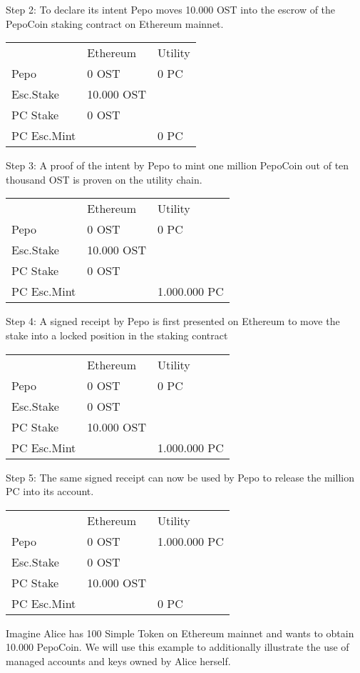 \documentclass[12pt,a4paper, twocolumn]{article}
\begin{document}
Step 2: To declare its intent Pepo moves 10.000 OST into the escrow of the PepoCoin staking contract on Ethereum mainnet. 
\begin{table}[H]
\centering
\label{Step-2}
\begin{tabular}{lll}
    & Ethereum    &   Utility   \\
Pepo        & 0 OST      & 0 PC \\
Esc.Stake   & 10.000 OST &      \\
PC Stake    & 0 OST      &      \\
PC Esc.Mint &            & 0 PC
\end{tabular}
\end{table}

Step 3: A proof of the intent by Pepo to mint one million PepoCoin out of ten thousand OST is proven on the utility chain.
\begin{table}[H]
\centering
\label{Step-3}
\begin{tabular}{lll}
    & Ethereum    &   Utility   \\
Pepo        & 0 OST      & 0 PC         \\
Esc.Stake   & 10.000 OST &              \\
PC Stake    & 0 OST      &              \\
PC Esc.Mint &            & 1.000.000 PC
\end{tabular}
\end{table} 

Step 4: A signed receipt by Pepo is first presented on Ethereum to move the stake into a locked position in the staking contract 
\begin{table}[H]
\centering
\label{Step-4}
\begin{tabular}{lll}
    & Ethereum    &   Utility   \\
Pepo        & 0 OST      & 0 PC         \\
Esc.Stake   & 0 OST      &              \\
PC Stake    & 10.000 OST &              \\
PC Esc.Mint &            & 1.000.000 PC
\end{tabular}
\end{table} 

Step 5: The same signed receipt can now be used by Pepo to release the million PC into its account.
\begin{table}[H]
\centering
\label{Step-5}
\begin{tabular}{lll}
    & Ethereum    &   Utility   \\
Pepo        & 0 OST      & 1.000.000 PC \\
Esc.Stake   & 0 OST      &              \\
PC Stake    & 10.000 OST &              \\
PC Esc.Mint &            & 0 PC        
\end{tabular}
\end{table} 
Imagine Alice has 100 Simple Token on Ethereum mainnet and wants to obtain 10.000 PepoCoin.  We will use this example to additionally illustrate the use of managed accounts and keys owned by Alice herself.\par 
\end{document}
